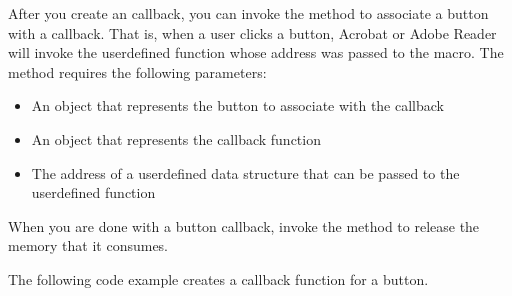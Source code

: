 \documentclass[letterpaper,12pt,english,openany,oneside]{sphinxmanual}
\begin{document}
\begin{sphinxVerbatim}[commandchars=\\\{\}]
   
   
\end{sphinxVerbatim}

After you create an  callback, you can invoke the  method to associate a button with a callback. That is, when a user clicks a button, Acrobat or Adobe Reader will invoke the user\sphinxhyphen{}defined function whose address was passed to the  macro. The  method requires the following parameters:
\begin{itemize}
\item {} 
An  object that represents the button to associate with the callback

\item {} 
An  object that represents the callback function

\item {} 
The address of a user\sphinxhyphen{}defined data structure that can be passed to the user\sphinxhyphen{}defined function

\end{itemize}

When you are done with a button callback, invoke the  method to release the memory that it consumes.

The following code example creates a callback function for a button.
\end{document}
